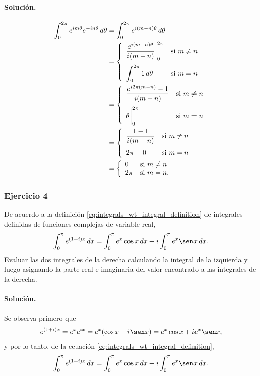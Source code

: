 \documentclass[a4paper]{report}
\begin{document}
\paragraph{Solución.} 
\begin{align*}
 \int_0^{2\pi}e^{im\theta}e^{-in\theta}\,d\theta&=\int_0^{2\pi}e^{i(m-n)\theta}\,d\theta\\
  &=\left\{ 
 \begin{array}{ll}
  \dfrac{e^{i(m-n)\theta}}{i(m-n)}\bigg|_0^{2\pi} & \textrm{si }m\neq n\\[\bigskipamount]
  \displaystyle\int_0^{2\pi}1\,d\theta & \textrm{si }m=n
 \end{array}
 \right.\\
 &=\left\{ 
 \begin{array}{ll}
  \dfrac{e^{i2\pi(m-n)}-1}{i(m-n)} & \textrm{si }m\neq n\\[\bigskipamount]
  \theta\bigg|_0^{2\pi} & \textrm{si }m=n
 \end{array}
 \right.\\
 &=\left\{ 
 \begin{array}{ll}
  \dfrac{1-1}{i(m-n)} & \textrm{si }m\neq n\\[\bigskipamount]
  2\pi-0 & \textrm{si }m=n
 \end{array}
 \right.\\
 &=\left\{ 
 \begin{array}{ll}
  0 & \textrm{si }m\neq n\\
  2\pi & \textrm{si }m=n.
 \end{array}
 \right.
\end{align*}
 
 
\subsubsection{Ejercicio 4} 

De acuerdo a la definición \ref{eq:integrals_wt_integral_definition} de integrales definidas de funciones complejas de variable real,
\[
 \int_0^\pi e^{(1+i)x}\,dx=\int_0^\pi e^x\cos x\,dx+i\int_0^\pi e^x\sen x\,dx.
\]
Evaluar las dos integrales de la derecha calculando la integral de la izquierda y luego asignando la parte real e imaginaria del valor encontrado a las integrales de la derecha.

\paragraph{Solución.} Se observa primero que 
\[
 e^{(1+i)x}=e^xe^{ix}=e^x(\cos x+i\sen x)=e^x\cos x+ie^x\sen x,
\]
y por lo tanto, de la ecuación \ref{eq:integrals_wt_integral_definition},
\[
 \int_0^\pi e^{(1+i)x}\,dx=\int_0^\pi e^x\cos x\,dx+i\int_0^\pi e^x\sen x\,dx.
\]
\end{document}
